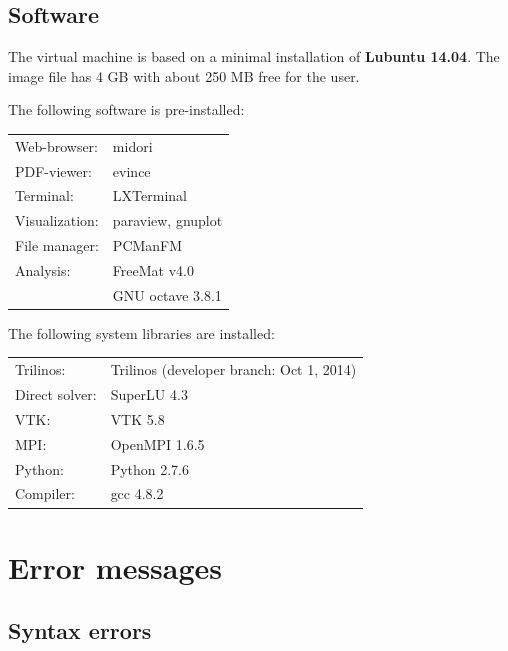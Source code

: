 \documentclass[10pt,fleqn]{book}
\begin{document}
\section{Software}

The virtual machine is based on a minimal installation of \textbf{Lubuntu 14.04}. The image file has 4 GB with about 250 MB free for the user.

The following software is pre-installed:

\begin{tabular}{ll}
Web-browser: & midori \\
PDF-viewer:  & evince \\
Terminal:    & LXTerminal\\
Visualization: & paraview, gnuplot \\
File manager: & PCManFM \\
Analysis: & FreeMat v4.0 \\
& GNU octave 3.8.1\\
\end{tabular}

The following system libraries are installed:

\begin{tabular}{ll}
Trilinos:     & Trilinos (developer branch: Oct 1, 2014) \\
Direct solver: & SuperLU 4.3 \\
VTK: & VTK 5.8 \\
MPI: & OpenMPI 1.6.5 \\
Python: & Python 2.7.6 \\
Compiler: & gcc 4.8.2
\end{tabular}


\chapter{Error messages}

\section{Syntax errors}
\end{document}
